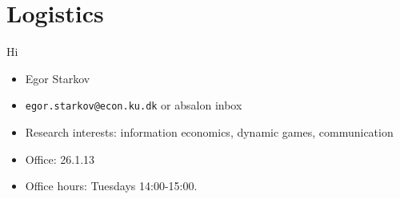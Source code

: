 \documentclass[english,10pt
,aspectratio=169
]{beamer}
\begin{document}





\section{Logistics}

\begin{frame}{Hi}
\begin{itemize}
	\item Egor Starkov
	\item \texttt{egor.starkov@econ.ku.dk} or absalon inbox
	\item Research interests: information economics, dynamic games, communication
	\item Office: 26.1.13
	\item Office hours: Tuesdays 14:00-15:00.
\end{itemize}
\end{frame}
\end{document}
